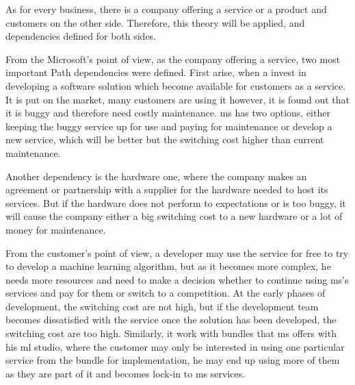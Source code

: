 As for every business, there is a company offering a service or a product and customers on the other side. Therefore, this theory will be applied, and dependencies defined for both sides.

From the Microsoft’s point of view, as the company offering a service, two most important Path dependencies were defined. First arise, when a invest in developing a software solution which become available for customers as a service. It is put on the market, many customers are using it however, it is found out that it is buggy and therefore need costly maintenance. \acrshort{ms} has two options, either keeping the buggy service up for use and paying for maintenance or develop a new service, which will be better but the switching cost higher than current maintenance. 

Another dependency is the hardware one, where the company makes an agreement or partnership with a supplier for the hardware needed to host its services. But if the hardware does not perform to expectations or is too buggy, it will cause the company either a big switching cost to a new hardware or a lot of money for maintenance. 

From the customer’s point of view, a developer may use the service for free to try to develop a machine learning algorithm, but as it becomes more complex, he needs more resources and need to make a decision whether to continue using \acrshort{ms}’s services and pay for them or switch to a competition. At the early phases of development, the switching cost are not high, but if the development team becomes dissatisfied with the service once the solution has been developed, the switching cost are too high. Similarly, it work with bundles that \acrshort{ms} offers with his \acrshort{ml} studio, where the customer may only be interested in using one particular service from the bundle for implementation, he may end up using more of them as they are part of it and becomes lock-in to \acrshort{ms} services. 